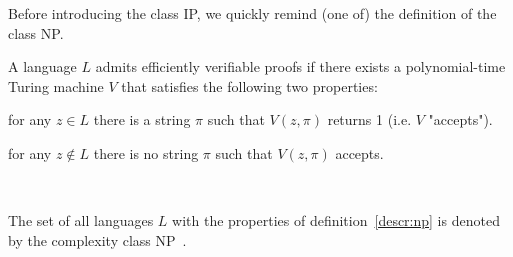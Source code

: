 
Before introducing the class IP, we quickly remind (one of) the definition of the class NP.

\begin{defn}
    A language $L$ admits efficiently verifiable proofs if there exists a polynomial-time Turing machine $V$ that satisfies the following two properties: 
    \begin{description}\label{descr:np}
        \item[Completeness: ]for any $z \in L$ there is a string $\pi$ such that $V(z, \pi)$ returns 1 (i.e. $V$ "accepts").
        \item[Soundness: ]for any $z \notin L$ there is no string $\pi$ such that $V(z, \pi)$ accepts. 
    \end{description}~\cite{Algorithms}
\end{defn}

\begin{defn}
    The set of all languages $L$ with the properties of definition~\ref{descr:np} is denoted by the complexity class NP~\cite{randomness}.
\end{defn}


